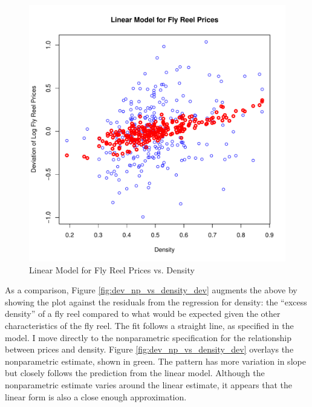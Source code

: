\begin{figure}[h!]
  \centering
  \includegraphics[scale = 0.5, keepaspectratio=true]{../Figures/dev_vs_density}
  \caption{Linear Model for Fly Reel Prices vs. Density} \label{fig:dev_vs_density}
\end{figure}



\pagebreak
As a comparison, Figure \ref{fig:dev_np_vs_density_dev} 
augments the above by showing the plot against the 
residuals from the regression for 
density:
the ``excess density'' of a fly reel 
compared to what would be 
expected given the other characteristics of the fly reel. 
The fit follows a straight line, as specified in the model. 
% 
I move directly to the nonparametric specification for 
the relationship between prices and 
density.
Figure \ref{fig:dev_np_vs_density_dev} 
overlays the nonparametric estimate, shown in green. 
The pattern has more variation in slope but 
closely follows the prediction from the linear model. 
Although the nonparametric estimate varies around the linear estimate,
it appears that the linear form
is also a close enough approximation.


